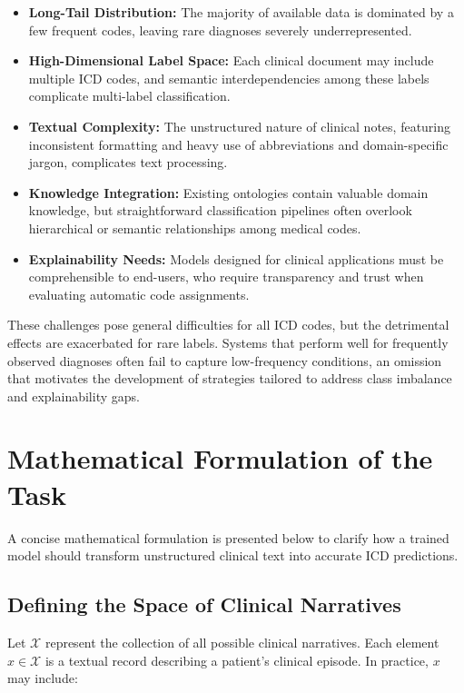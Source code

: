 \begin{itemize}
    \item \textbf{Long-Tail Distribution:} The majority of available data is dominated by a few frequent codes, leaving rare diagnoses severely underrepresented.
    \item \textbf{High-Dimensional Label Space:} Each clinical document may include multiple ICD codes, and semantic interdependencies among these labels complicate multi-label classification.
    \item \textbf{Textual Complexity:} The unstructured nature of clinical notes, featuring inconsistent formatting and heavy use of abbreviations and domain-specific jargon, complicates text processing.
    \item \textbf{Knowledge Integration:} Existing ontologies contain valuable domain knowledge, but straightforward classification pipelines often overlook hierarchical or semantic relationships among medical codes.
    \item \textbf{Explainability Needs:} Models designed for clinical applications must be comprehensible to end-users, who require transparency and trust when evaluating automatic code assignments.
\end{itemize}

These challenges pose general difficulties for all ICD codes, but the detrimental effects are exacerbated for rare labels. Systems that perform well for frequently observed diagnoses often fail to capture low-frequency conditions, an omission that motivates the development of strategies tailored to address class imbalance and explainability gaps.

\section{Mathematical Formulation of the Task}
\label{sec:mathformulation}

A concise mathematical formulation is presented below to clarify how a trained model should transform unstructured clinical text into accurate ICD predictions.

\subsection{Defining the Space of Clinical Narratives}
Let \(\mathcal{X}\) represent the collection of all possible clinical narratives. Each element \(x \in \mathcal{X}\) is a textual record describing a patient's clinical episode. In practice, \(x\) may include:

